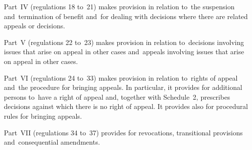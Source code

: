 \documentclass[12pt,a4paper]{article}
\begin{document}
Part~IV (regulations 18 to~21) makes provision in relation to~the suspension and~termination of benefit and~for dealing with decisions where there are related appeals or decisions.

Part~V (regulations 22 to~23) makes provision in relation to~decisions involving issues that arise on appeal in other cases and~appeals involving issues that arise on appeal in other cases.

Part~VI (regulations 24 to~33) makes provision in relation to~rights of appeal and~the procedure for bringing appeals. In particular, it provides for additional persons to~have a right of appeal and, together with Schedule~2, prescribes decisions against which there is no right of appeal. It provides also for procedural rules for bringing appeals.

Part~VII (regulations 34 to~37) provides for revocations, transitional provisions and~consequential amendments. 
\end{document}
